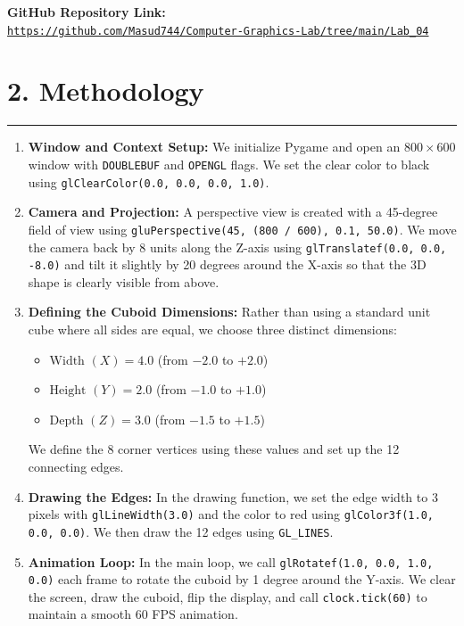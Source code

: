 \documentclass[11pt,a4paper]{article}
\begin{document}
\noindent\textbf{GitHub Repository Link:}\\
\href{https://github.com/Masud744/Computer-Graphics-Lab/tree/main/Lab_04}{\texttt{https://github.com/Masud744/Computer-Graphics-Lab/tree/main/Lab\_04}}

\vspace{0.35cm}
\section*{2. Methodology}
\noindent\rule{\textwidth}{0.6pt}\vspace{0.15cm}

\begin{enumerate}
    \item \textbf{Window and Context Setup:} We initialize Pygame and open an $800 \times 600$ window with \texttt{DOUBLEBUF} and \texttt{OPENGL} flags. We set the clear color to black using \texttt{glClearColor(0.0, 0.0, 0.0, 1.0)}.
    
    \item \textbf{Camera and Projection:} A perspective view is created with a 45-degree field of view using \texttt{gluPerspective(45, (800 / 600), 0.1, 50.0)}. We move the camera back by 8 units along the Z-axis using \texttt{glTranslatef(0.0, 0.0, -8.0)} and tilt it slightly by 20 degrees around the X-axis so that the 3D shape is clearly visible from above.
    
    \item \textbf{Defining the Cuboid Dimensions:} Rather than using a standard unit cube where all sides are equal, we choose three distinct dimensions:
    \begin{itemize}
        \item $\text{Width } (X) = 4.0$ (from $-2.0$ to $+2.0$)
        \item $\text{Height } (Y) = 2.0$ (from $-1.0$ to $+1.0$)
        \item $\text{Depth } (Z) = 3.0$ (from $-1.5$ to $+1.5$)
    \end{itemize}
    We define the 8 corner vertices using these values and set up the 12 connecting edges.
    
    \item \textbf{Drawing the Edges:} In the drawing function, we set the edge width to 3 pixels with \texttt{glLineWidth(3.0)} and the color to red using \texttt{glColor3f(1.0, 0.0, 0.0)}. We then draw the 12 edges using \texttt{GL\_LINES}.
    
    \item \textbf{Animation Loop:} In the main loop, we call \texttt{glRotatef(1.0, 0.0, 1.0, 0.0)} each frame to rotate the cuboid by 1 degree around the Y-axis. We clear the screen, draw the cuboid, flip the display, and call \texttt{clock.tick(60)} to maintain a smooth 60 FPS animation.
\end{enumerate}
\end{document}
